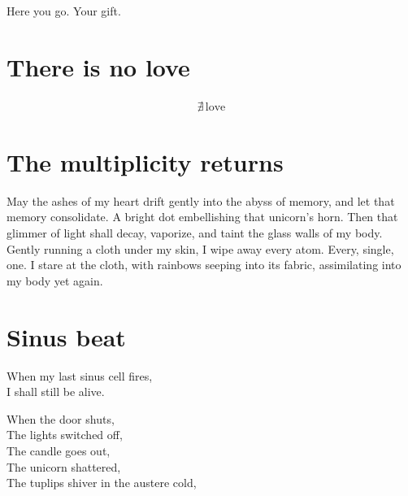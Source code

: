 \documentclass[parskip=full,12pt,oneside,openany,a5paper,numbers=endperiod]{scrbook}
\begin{document}
Here you go. Your gift.

\chapter{There is no love}

\begingroup
\fontsize{50}{60}\selectfont
\begin{align*}
	\nexists\,\text{love}
\end{align*}
\endgroup




\chapter{The multiplicity returns}

May the ashes of my heart drift gently into the abyss of memory,
and let that memory consolidate.
A bright dot embellishing that unicorn's horn.
Then that glimmer of light shall decay, vaporize, and taint the glass walls of my body.
Gently running a cloth under my skin,
I wipe away every atom.
Every, single, one.
I stare at the cloth,
with rainbows seeping into its fabric,
assimilating into my body yet again.

\chapter{Sinus beat}

When my last sinus cell fires,\\
I shall still be alive.

When the door shuts,\\
The lights switched off,\\
The candle goes out,\\
The unicorn shattered,\\
The tuplips shiver in the austere cold,
\end{document}
